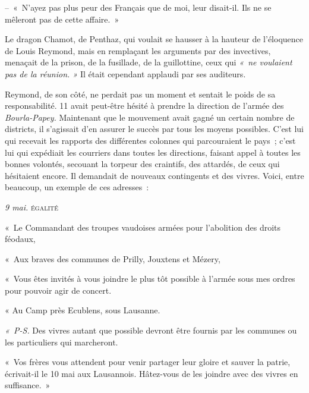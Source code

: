 \documentclass[french,twoside]{book} %
\newenvironment{quoteblock}%
  {\begin{quoting}}
  {\end{quoting}}
\newenvironment{quotebar}{%
    \def\FrameCommand{{\color{rubric!10!}\vrule width 0.5em} \hspace{0.9em}}%
    \def\OuterFrameSep{\itemsep} %
    \MakeFramed {\advance\hsize-\width \FrameRestore}
  }%
  {%
    \endMakeFramed
  }
\renewenvironment{quoteblock}%
  {%
    \savenotes
    \setstretch{0.9}
    \normalfont
    \begin{quotebar}
  }
  {%
    \end{quotebar}
    \spewnotes
  }
\begin{document}
\begin{quoteblock}
\noindent – « N’ayez pas plus peur des Français que de moi, leur disait-il. Ils ne se mêleront pas de cette affaire. »\end{quoteblock}

\noindent Le dragon Chamot, de Penthaz, qui voulait se hausser à la hauteur de l’éloquence de Louis Reymond, mais en remplaçant les arguments par des invectives, menaçait de la prison, de la fusillade, de la guillottine, ceux qui \emph{« ne voulaient pas de la réunion. »} Il était cependant applaudi par ses auditeurs.\par
Reymond, de son côté, ne perdait pas un moment et sentait le poids de sa responsabilité. 11 avait peut-être hésité à prendre la direction de l’armée des \emph{Bourla-Papey.} Maintenant que le mouvement avait gagné un certain nombre de districts, il s’agissait d’en assurer le succès par tous les moyens possibles. C’est lui qui recevait les rapports des différentes colonnes qui parcouraient le pays ; c’est lui qui expédiait les courriers dans toutes les directions, faisant appel à toutes les bonnes volontés, secouant la torpeur des craintifs, des attardés, de ceux qui hésitaient encore. Il demandait de nouveaux contingents et des vivres. Voici, entre beaucoup, un exemple de ces adresses :\par

\begin{quoteblock}
  \emph{9 mai.} {\scshape égalité}\par
 « Le Commandant des troupes vaudoises armées pour l’abolition des droits féodaux,\par
 « Aux braves des communes de Prilly, Jouxtens et Mézery,\par
 « Vous êtes invités à vous joindre le plus tôt possible à l’armée sous mes ordres pour pouvoir agir de concert.\par
 « Au Camp près Ecublens, sous Lausanne.\par
 \emph{« P-S.} Des vivres autant que possible devront être fournis par les communes ou les particuliers qui marcheront.\par
 « Vos frères vous attendent pour venir partager leur gloire et sauver la patrie, écrivait-il le 10 mai aux Lausannois. Hâtez-vous de les joindre avec des vivres en suffisance. »
 \end{quoteblock}
\end{document}
